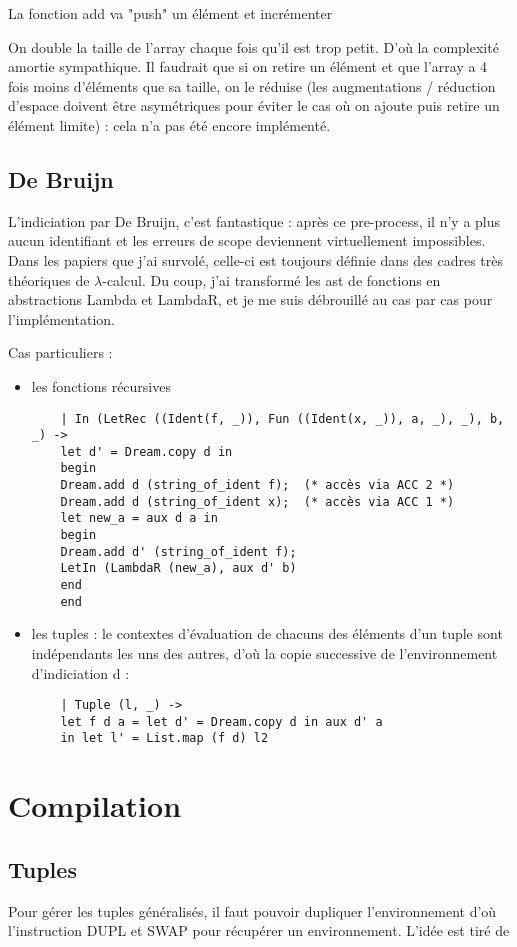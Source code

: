 \documentclass[paper=a4, fontsize=11pt, twocolumn]{article}
\begin{document}
La fonction add va "push" un élément et incrémenter 

On double la taille de l'array chaque fois qu'il est trop petit. D'où la complexité amortie sympathique.
Il faudrait que si on retire un élément et que l'array a 4 fois moins d'éléments que sa taille, on le réduise (les augmentations / réduction d'espace doivent être asymétriques pour éviter le cas où on ajoute puis retire un élément limite) : cela n'a pas été encore implémenté.

\subsection{De Bruijn}
L'indiciation par De Bruijn, c'est fantastique : après ce pre-process, il n'y a plus aucun identifiant et les erreurs de scope deviennent virtuellement impossibles.
Dans les papiers que j'ai survolé, celle-ci est toujours définie dans des cadres très théoriques de $\lambda$-calcul. Du coup, j'ai transformé les ast de fonctions en abstractions Lambda et LambdaR, et je me suis débrouillé au cas par cas pour l'implémentation.

Cas particuliers :
\begin{itemize}
	\item les fonctions récursives
	\begin{verbatim}
	| In (LetRec ((Ident(f, _)), Fun ((Ident(x, _)), a, _), _), b, _) ->
	let d' = Dream.copy d in
	begin
	Dream.add d (string_of_ident f);  (* accès via ACC 2 *)
	Dream.add d (string_of_ident x);  (* accès via ACC 1 *)
	let new_a = aux d a in
	begin
	Dream.add d' (string_of_ident f);
	LetIn (LambdaR (new_a), aux d' b)
	end
	end
	\end{verbatim}
	\item les tuples : le contextes d'évaluation de chacuns des éléments d'un tuple sont indépendants les uns des autres, d'où la copie successive de l'environnement d'indiciation d : 
	\begin{verbatim}
	| Tuple (l, _) ->
	let f d a = let d' = Dream.copy d in aux d' a
	in let l' = List.map (f d) l2
	\end{verbatim}
\end{itemize}

\section{Compilation}
\subsection{Tuples}
Pour gérer les tuples généralisés, il faut pouvoir dupliquer l'environnement d'où l'instruction DUPL et SWAP pour récupérer un environnement.
L'idée est tiré de \cite{cousineau}
\end{document}
